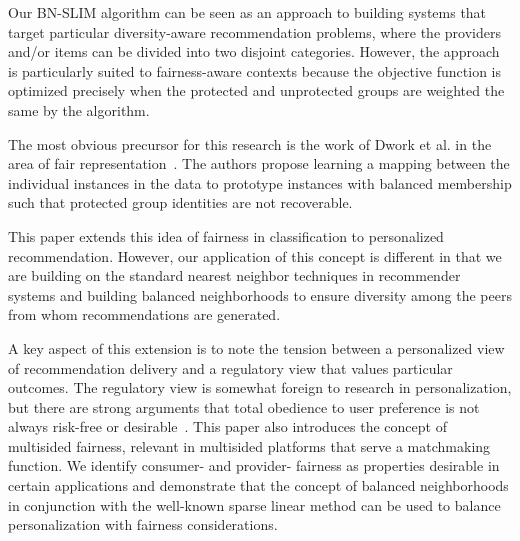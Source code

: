 Our BN-SLIM algorithm can be seen as an approach to building systems that target particular diversity-aware recommendation problems, where the providers and/or items can be divided into two disjoint categories. However, the approach is particularly suited to fairness-aware contexts because the objective function is optimized precisely when the protected and unprotected groups are weighted the same by the algorithm. 

The most obvious precursor for this research is the work of Dwork et al. in the area of fair representation~\cite{zemel2013learning,Dwork2012individual}. The authors propose learning a mapping between the individual instances in the data to prototype instances with balanced membership such that protected group identities are not recoverable.

This paper extends this idea of fairness in classification to personalized recommendation. However, our application of this concept is different in that we are building on the standard nearest neighbor techniques in recommender systems and building balanced neighborhoods to ensure diversity among the peers from whom recommendations are generated.

A key aspect of this extension is to note the tension between a personalized view of recommendation delivery and a regulatory view that values particular outcomes. The regulatory view is somewhat foreign to research in personalization, but there are strong arguments that total obedience to user preference is not always risk-free or desirable~\cite{pariser2011filter,sunstein2009republic}. This paper also introduces the concept of multisided fairness, relevant in multisided platforms that serve a matchmaking function. We identify consumer- and provider- fairness as properties desirable in certain applications and demonstrate that the concept of balanced neighborhoods in conjunction with the well-known sparse linear method can be used to balance personalization with fairness considerations.

